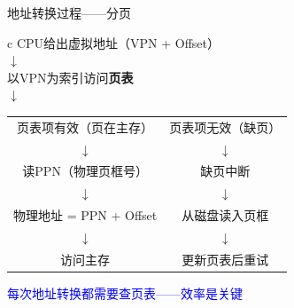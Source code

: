 \documentclass[10pt, aspectratio=169]{beamer}
\begin{document}
\begin{frame}{地址转换过程——分页}
    \begin{center}
        \begin{tabular}{c}
            CPU给出虚拟地址（VPN + Offset） \\
            $\downarrow$ \\
            以VPN为索引访问\textbf{页表} \\
            $\downarrow$ \\
            \begin{tabular}{c|c}
                页表项有效（页在主存） & 页表项无效（缺页） \\
                $\downarrow$ & $\downarrow$ \\
                读PPN（物理页框号） & 缺页中断 \\
                $\downarrow$ & $\downarrow$ \\
                物理地址 = PPN + Offset & 从磁盘读入页框 \\
                $\downarrow$ & $\downarrow$ \\
                访问主存 & 更新页表后重试 \\
            \end{tabular}
        \end{tabular}
    \end{center}
    \vspace{0.3em}
    \begin{center}
        \textcolor{blue}{每次地址转换都需要查页表——效率是关键}
    \end{center}
\end{frame}
\end{document}
